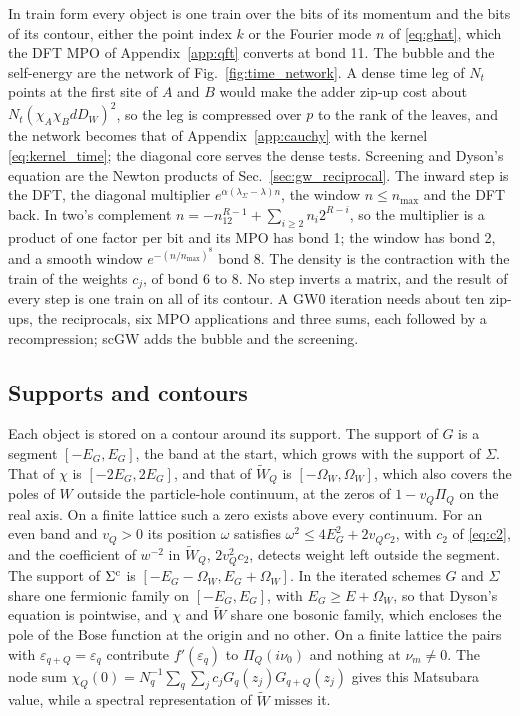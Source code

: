 \documentclass[aps,prb,reprint,a4paper]{revtex4-2}
\begin{document}
In train form every object is one train over the bits of its momentum and the bits of its contour, either the point index $k$ or the Fourier mode $n$ of \eqref{eq:ghat}, which the DFT MPO of Appendix~\ref{app:qft} converts at bond 11. The bubble and the self-energy are the network of Fig.~\ref{fig:time_network}. A dense time leg of $N_t$ points at the first site of $A$ and $B$ would make the adder zip-up cost about $N_t(\chi_A\chi_BdD_W)^2$, so the leg is compressed over $p$ to the rank of the leaves, and the network becomes that of Appendix~\ref{app:cauchy} with the kernel \eqref{eq:kernel_time}; the diagonal core serves the dense tests. Screening and Dyson's equation are the Newton products of Sec.~\ref{sec:gw_reciprocal}. The inward step is the DFT, the diagonal multiplier $e^{\alpha(\lambda_\Sigma-\lambda)n}$, the window $n\le n_{\max}$ and the DFT back. In two's complement $n=-n_12^{R-1}+\sum_{i\ge2}n_i2^{R-i}$, so the multiplier is a product of one factor per bit and its MPO has bond 1; the window has bond 2, and a smooth window $e^{-(n/n_{\max})^8}$ bond 8. The density is the contraction with the train of the weights $c_j$, of bond 6 to 8. No step inverts a matrix, and the result of every step is one train on all of its contour. A GW0 iteration needs about ten zip-ups, the reciprocals, six MPO applications and three sums, each followed by a recompression; scGW adds the bubble and the screening.

\subsection{Supports and contours}
\label{sec:gw_contours}

Each object is stored on a contour around its support. The support of $G$ is a segment $[-E_G,E_G]$, the band at the start, which grows with the support of $\Sigma$. That of $\chi$ is $[-2E_G,2E_G]$, and that of $\tilde W_Q$ is $[-\Omega_W,\Omega_W]$, which also covers the poles of $W$ outside the particle-hole continuum, at the zeros of $1-v_Q\Pi_Q$ on the real axis. On a finite lattice such a zero exists above every continuum. For an even band and $v_Q>0$ its position $\omega$ satisfies $\omega^2\le4E_G^2+2v_Qc_2$, with $c_2$ of \eqref{eq:c2}, and the coefficient of $w^{-2}$ in $\tilde W_Q$, $2v_Q^2c_2$, detects weight left outside the segment. The support of $\Sigma^{\rm c}$ is $[-E_G-\Omega_W,E_G+\Omega_W]$. In the iterated schemes $G$ and $\Sigma$ share one fermionic family on $[-E_G,E_G]$, with $E_G\ge E+\Omega_W$, so that Dyson's equation is pointwise, and $\chi$ and $\tilde W$ share one bosonic family, which encloses the pole of the Bose function at the origin and no other. On a finite lattice the pairs with $\varepsilon_{q+Q}=\varepsilon_q$ contribute $f'(\varepsilon_q)$ to $\Pi_Q(i\nu_0)$ and nothing at $\nu_m\neq0$. The node sum $\chi_Q(0)=N_q^{-1}\sum_q\sum_jc_jG_q(z_j)G_{q+Q}(z_j)$ gives this Matsubara value, while a spectral representation of $\tilde W$ misses it.
\end{document}
